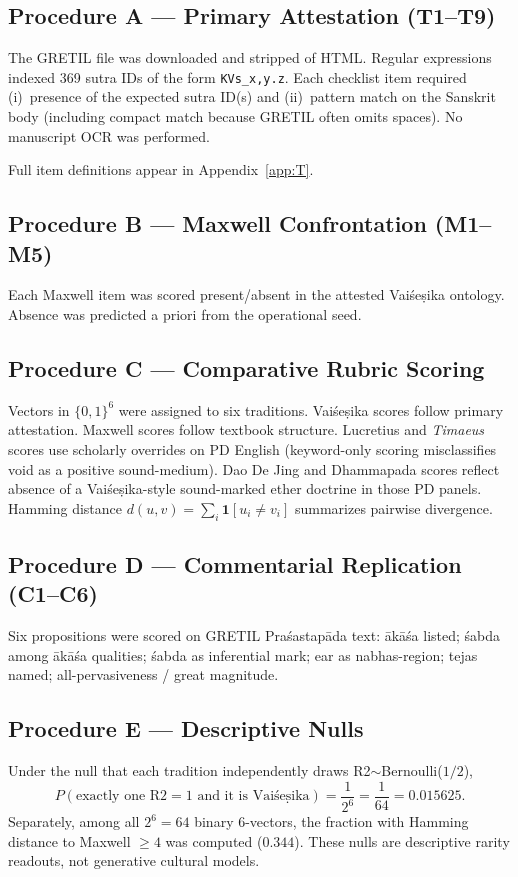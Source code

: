 \documentclass[12pt]{article}
\newcommand{\Vais}{Vaiśeṣika}
\newcommand{\akasa}{ākāśa}
\newcommand{\sabda}{śabda}
\newcommand{\Pras}{Praśastapāda}
\begin{document}
\subsection{Procedure A --- Primary Attestation (T1--T9)}
The GRETIL file was downloaded and stripped of HTML.
Regular expressions indexed 369 sutra IDs of the form
\texttt{KVs\_x,y.z}.
Each checklist item required (i)~presence of the expected sutra ID(s) and
(ii)~pattern match on the Sanskrit body
(including compact match because GRETIL often omits spaces).
No manuscript OCR was performed.

Full item definitions appear in Appendix~\ref{app:T}.

\subsection{Procedure B --- Maxwell Confrontation (M1--M5)}
Each Maxwell item was scored present/absent in the attested \Vais{} ontology.
Absence was predicted a priori from the operational seed.

\subsection{Procedure C --- Comparative Rubric Scoring}
Vectors in $\{0,1\}^6$ were assigned to six traditions.
\Vais{} scores follow primary attestation.
Maxwell scores follow textbook structure.
Lucretius and \emph{Timaeus} scores use scholarly overrides on PD English (keyword-only scoring misclassifies void as a positive sound-medium).
Dao De Jing and Dhammapada scores reflect absence of a \Vais-style sound-marked ether doctrine in those PD panels.
Hamming distance $d(u,v)=\sum_i \mathbf{1}[u_i\neq v_i]$ summarizes pairwise divergence.

\subsection{Procedure D --- Commentarial Replication (C1--C6)}
Six propositions were scored on GRETIL \Pras{} text: \akasa{} listed; \sabda{} among \akasa{} qualities; \sabda{} as inferential mark; ear as nabhas-region; tejas named; all-pervasiveness / great magnitude.

\subsection{Procedure E --- Descriptive Nulls}
Under the null that each tradition independently draws R2$\sim$Bernoulli($1/2$),
\[
P(\text{exactly one R2$=1$ and it is \Vais})=\frac{1}{2^6}=\frac{1}{64}=0.015625.
\]
Separately, among all $2^6=64$ binary 6-vectors, the fraction with Hamming distance to Maxwell $\ge 4$ was computed ($0.344$).
These nulls are descriptive rarity readouts, not generative cultural models.
\end{document}
